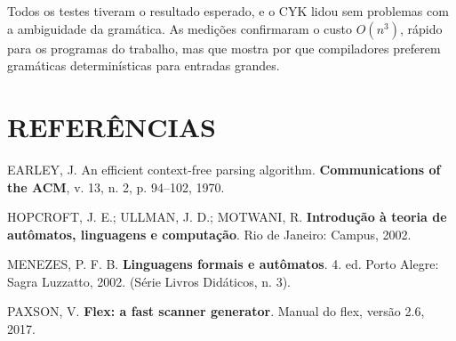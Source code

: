 \documentclass[12pt,a4paper]{article}
\begin{document}
Todos os testes tiveram o resultado esperado, e o CYK lidou sem problemas com a ambiguidade da
gramática. As medições confirmaram o custo $O(n^3)$, rápido para os programas do trabalho, mas
que mostra por que compiladores preferem gramáticas determinísticas para entradas grandes.

\section*{REFERÊNCIAS}
\begin{flushleft}
\singlespacing
\setlength{\parindent}{0pt}
\setlength{\parskip}{10pt}

EARLEY, J. An efficient context-free parsing algorithm. \textbf{Communications of the ACM},
v. 13, n. 2, p. 94--102, 1970.

HOPCROFT, J. E.; ULLMAN, J. D.; MOTWANI, R. \textbf{Introdução à teoria de autômatos,
linguagens e computação}. Rio de Janeiro: Campus, 2002.

MENEZES, P. F. B. \textbf{Linguagens formais e autômatos}. 4. ed. Porto Alegre: Sagra
Luzzatto, 2002. (Série Livros Didáticos, n. 3).

PAXSON, V. \textbf{Flex: a fast scanner generator}. Manual do flex, versão 2.6, 2017.
\end{flushleft}
\end{document}
